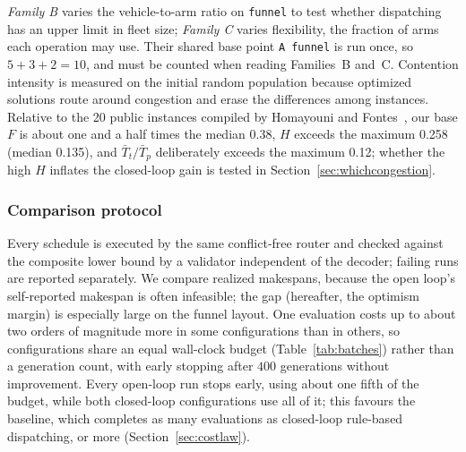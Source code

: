 \documentclass[manuscript,screen,review]{acmart}
\newcommand{\NCases}{10}
\newcommand{\PubFMed}{0.38}              %
\newcommand{\PubHMed}{0.135}             %
\newcommand{\PubHMax}{0.258}             %
\newcommand{\PubTtTpHi}{0.12}            %
\newcommand{\PubNInst}{20}
\begin{document}
\emph{Family B} varies the vehicle-to-arm ratio on \texttt{funnel} to test whether dispatching has an upper limit in fleet size; \emph{Family C} varies flexibility, the fraction of arms each operation may use.
Their shared base point \texttt{A funnel} is run once, so $5+3+2=\NCases$, and must be counted when reading Families~B and~C.
Contention intensity is measured on the initial random population because optimized solutions route around congestion and erase the differences among instances.
Relative to the \PubNInst{} public instances compiled by Homayouni and Fontes~\cite{homayouni2021production}, our base $F$ is about one and a half times the median \PubFMed{}, $H$ exceeds the maximum \PubHMax{} (median \PubHMed{}), and $\bar{T}_t/\bar{T}_p$ deliberately exceeds the maximum \PubTtTpHi{}; whether the high $H$ inflates the closed-loop gain is tested in Section~\ref{sec:whichcongestion}.

\begin{table}[t]
\caption{Controlled instances. Shared core: $12$ jobs, $36$ real operations, $8$ arms, $H=0.3$, $\bar{T}_t/\bar{T}_p\approx4.0$.
Contention intensity: share of yielding wait in travel time on the initial random population.}
\label{tab:instances}
\small

\end{table}

\subsubsection{Comparison protocol}
\label{sec:protocol}

Every schedule is executed by the same conflict-free router and checked against the composite lower bound by a validator independent of the decoder; failing runs are reported separately.
We compare realized makespans, because the open loop's self-reported makespan is often infeasible; the gap (hereafter, the optimism margin) is especially large on the funnel layout.
One evaluation costs up to about two orders of magnitude more in some configurations than in others, so configurations share an equal wall-clock budget (Table~\ref{tab:batches}) rather than a generation count, with early stopping after $400$ generations without improvement.
Every open-loop run stops early, using about one fifth of the budget, while both closed-loop configurations use all of it; this favours the baseline, which completes as many evaluations as closed-loop rule-based dispatching, or more (Section~\ref{sec:costlaw}).
\end{document}
